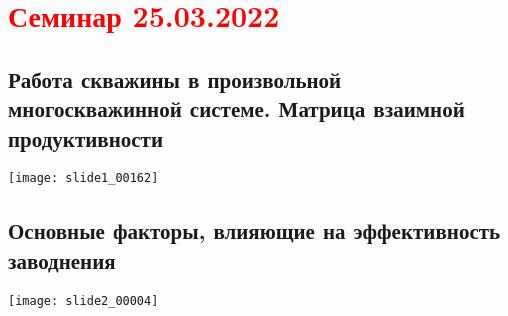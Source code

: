 \documentclass[main.tex]{subfiles}
\begin{document}
\section{\textcolor{red}{Семинар 25.03.2022}}

\subsection{Работа скважины в произвольной многоскважинной системе. Матрица взаимной продуктивности}

\texttt{[image: slide1\_00162]}














\subsection{Основные факторы, влияющие на эффективность заводнения}

\texttt{[image: slide2\_00004]}


\end{document}
